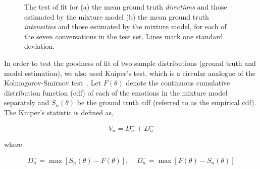 \documentclass[10pt,journal,cspaper,compsoc]{IEEEtran}
\begin{document}
\begin{figure}[tp!]
\begin{center}
\end{center}
		\caption{The test of fit for (a) the mean ground truth \textit{directions} and those estimated by the mixture model (b) the mean ground truth \textit{intensities} and those estimated by the mixture model, for each of the seven conversations in the test set. Lines mark one standard deviation.}
		\label{fig_comparison}
\end{figure}

In order to test the goodness of fit of two sample distributions (ground truth and model estimation), we also used Kuiper's test, which is a circular analogue of the Kolmogorov-Smirnov test~\cite{watson1982circular, mardia1972statistics}. Let $F(\theta)$ denote the continuous cumulative distribution function (cdf) of each of the emotions in the mixture model separately and $S_{n}(\theta)$ be the ground truth cdf (referred to as the empirical cdf). The Kuiper's statistic is defined as,

\begin{equation}
V_{n}=D_{n}^{+}+D_{n}^{-}
\label{eq_kstatistic}
\end{equation}

\noindent where

\begin{equation}
D_{n}^{+}=\max[S_{n}(\theta)-F(\theta)], \;\;\;\; D_{n}^{-}=\max[F(\theta)-S_{n}(\theta)]
\label{eq_deviation}
\end{equation}
\end{document}
